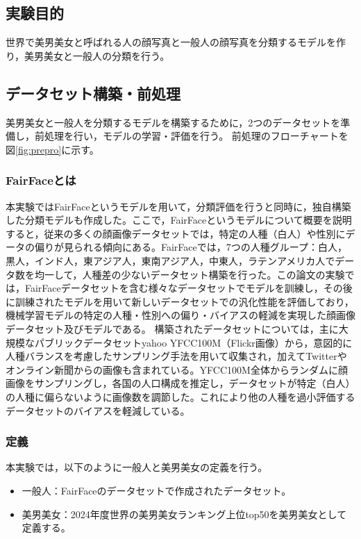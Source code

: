 \documentclass[a4paper,11pt,titlepage]{jsarticle}
\begin{document}
\subsection{実験目的}
世界で美男美女と呼ばれる人の顔写真と一般人の顔写真を分類するモデルを作り，美男美女と一般人の分類を行う。

\subsection{データセット構築・前処理}
美男美女と一般人を分類するモデルを構築するために，2つのデータセットを準備し，前処理を行い，モデルの学習・評価を行う。
前処理のフローチャートを図\ref{fig:prepro}に示す。


\subsubsection{FairFaceとは}
本実験ではFairFaceというモデルを用いて，分類評価を行うと同時に，独自構築した分類モデルも作成した。ここで，FairFaceというモデルについて概要を説明すると，従来の多くの顔画像データセットでは，特定の人種（白人）や性別にデータの偏りが見られる傾向にある。FairFaceでは，7つの人種グループ：白人，黒人，インド人，東アジア人，東南アジア人，中東人，ラテンアメリカ人でデータ数を均一して，人種差の少ないデータセット構築を行った。この論文の実験では，FairFaceデータセットを含む様々なデータセットでモデルを訓練し，その後に訓練されたモデルを用いて新しいデータセットでの汎化性能を評価しており，機械学習モデルの特定の人種・性別への偏り・バイアスの軽減を実現した顔画像データセット及びモデルである。
構築されたデータセットについては，主に大規模なパブリックデータセットyahoo YFCC100M（Flickr画像）から，意図的に人種バランスを考慮したサンプリング手法を用いて収集され，加えてTwitterやオンライン新聞からの画像も含まれている。YFCC100M全体からランダムに顔画像をサンプリングし，各国の人口構成を推定し，データセットが特定（白人）の人種に偏らないように画像数を調節した。これにより他の人種を過小評価するデータセットのバイアスを軽減している。




\subsubsection{定義}
本実験では，以下のように一般人と美男美女の定義を行う。
\begin{itemize}
    \item 一般人：FairFaceのデータセットで作成されたデータセット。
    \item 美男美女：2024年度世界の美男美女ランキング上位top50を美男美女として定義する。
\end{itemize}
\end{document}
